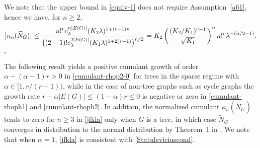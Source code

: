 \documentclass[12pt]{article}
\newenvironment{Proof}{\removelastskip\par\medskip
\noindent{\em Proof.} \rm}{\penalty-20\null\hfill$\square$\par\medbreak}
\numberwithin{equation}{section}
\begin{document}
\begin{Proof}
  We note that the upper bound in \eqref{equiv-1}
  does not require Assumption~\ref{a61},
  hence we have, for $n\geq 2$,
$$ 
   \big|\kappa_n(\widetilde{N}_G)\big|
  \leq 
   \frac{n!^r %
     c_\lambda^{n|E(G)|} (K_2 \lambda )^{1+(r-1)n}}{\big((2-1)! c_\lambda^{2|E(G)|}
   (K_1 \lambda )^{1+2(r-1)}\big)^{n/2}}
 = 
   K_2
   \left(
   \frac{ %
      (K_2/K_1)^{r-1}}{\sqrt{K_1}}
   \right)^n
   n!^r \lambda^{-(n/2-1)}. 
$$ 
\end{Proof}
The following result yields a positive cumulant growth
of order $\alpha     -(\alpha - 1)r>0$
in \eqref{cumulant-rhop2-0} for trees in the sparse regime
with $\alpha \in [1, r/(r-1) )$,
while in the case of non-tree graphs such as
cycle graphs the growth rate
$r - \alpha |E(G)|
\leq ( 1 - \alpha ) r \leq 0$
is negative or zero in \eqref{cumulant-rhoph1} and \eqref{cumulant-rhoph2}. 
In addition, the normalized cumulant 
$\kappa_n(\widetilde{N}_G)$ tends to zero for $n\geq 3$ in \eqref{jfkla} only
when $G$ is a tree, in which case 
$\widetilde{N}_G$ converges in distribution to the normal
distribution by Theorem~1 in \cite{Janson1988}.   
We note that when $\alpha = 1$, \eqref{jfkla} is consistent with
 \eqref{Statuleviciuscond}. 
\end{document}
